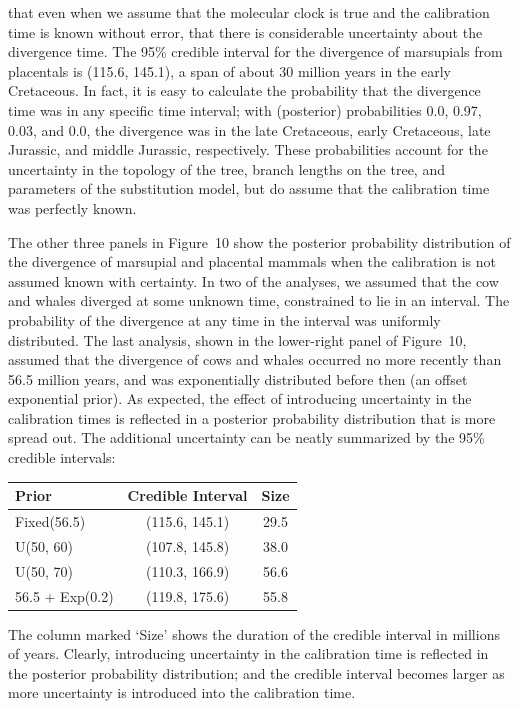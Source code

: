 \documentclass{svmult}
\begin{document}
that even when we assume that the molecular clock is true and the calibration time is known without
error, that there is considerable uncertainty about the divergence time. The 95\% credible interval
for the divergence of marsupials from placentals is (115.6, 145.1), a span of about 30 million
years in the early Cretaceous.  In fact, it is easy to calculate the probability that the
divergence time was in any specific time interval; with (posterior) probabilities 0.0, 0.97, 0.03,
and 0.0, the divergence was in the late Cretaceous, early Cretaceous, late Jurassic, and middle
Jurassic, respectively. These probabilities account for the uncertainty in the topology of the
tree, branch lengths on the tree, and parameters of the substitution model, but do assume that the
calibration time was perfectly known.

The other three panels in Figure~10 show the posterior probability distribution of the divergence
of marsupial and placental mammals when the calibration is not assumed known with certainty. In two
of the analyses, we assumed that the cow and whales diverged at some unknown time, constrained to
lie in an interval. The probability of the divergence at any time in the interval was uniformly
distributed. The last analysis, shown in the lower-right panel of Figure~10, assumed that the
divergence of cows and whales occurred no more recently than 56.5 million years, and was
exponentially distributed before then (an offset exponential prior). As expected, the effect of
introducing uncertainty in the calibration times is reflected in a posterior probability
distribution that is more spread out. The additional uncertainty can be neatly summarized by the
95\% credible intervals:
\begin{center}
\begin{tabular}{lcc}
Prior & Credible Interval &Size \\ \hline
Fixed(56.5) & (115.6, 145.1) & 29.5\\
U(50, 60) & (107.8, 145.8) & 38.0 \\
U(50, 70) & (110.3, 166.9) & 56.6\\
56.5 + Exp(0.2) & (119.8, 175.6) & 55.8\\ 
\end{tabular}
\end{center}
The column marked `Size' shows the duration of the credible interval in millions of years. Clearly,
introducing uncertainty in the calibration time is reflected in the posterior probability
distribution; and the credible interval becomes larger as more uncertainty is introduced into the
calibration time.
\end{document}
